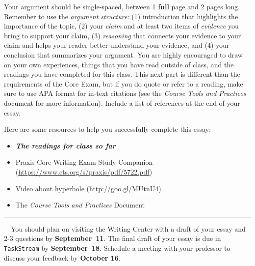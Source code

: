 \documentclass[12pt]{article}
\newcommand{\dueDate}[1]{\textbf{\textcolor{fsuMaroon}{#1}}}
\begin{document}
Your argument should be single-spaced, between 1 \textbf{full} page and 2 pages long. Remember to use the \emph{argument structure:} (1) introduction that highlights the importance of the topic, (2) your \textit{claim} and at least two items of \textit{evidence} you bring to support your claim, (3) \textit{reasoning} that connects your evidence to your claim and helps your reader better understand your evidence, and (4) your conclusion that summarizes your argument. You are highly encouraged to draw on your own experiences, things that you have read outside of class, and the readings you have completed for this class. This next part is different than the requirements of the Core Exam, but if you do quote or refer to a reading, make sure to use APA format for in-text citations (see the \textit{Course Tools and Practices} document for more information). Include a list of references at the end of your essay.

Here are some resources to help you successfully complete this essay:
\begin{itemize}
	\itemsep-0.5em
	\item \emph{\textbf{The readings for class so far}}
	\item Praxis Core Writing Exam Study Companion (\url{https://www.ets.org/s/praxis/pdf/5722.pdf})
	\item Video about hyperbole (\url{http://goo.gl/MUtnU4})
	\item The \textit{Course Tools and Practices} Document
\end{itemize}

\vfill

\begin{center}\rule{4in}{1pt}\end{center}
\noindent\lettrine{\dueDate{\faCalendar}}{~~}\normalsize\textsf{You should plan on visiting the Writing Center with a draft of your essay and 2-3 questions by \dueDate{September~11}. The final draft of your essay is due in \texttt{TaskStream} by \dueDate{September~18}. Schedule a meeting with your professor to discuss your feedback by \dueDate{October 16}.}

\newpage


\end{document}
